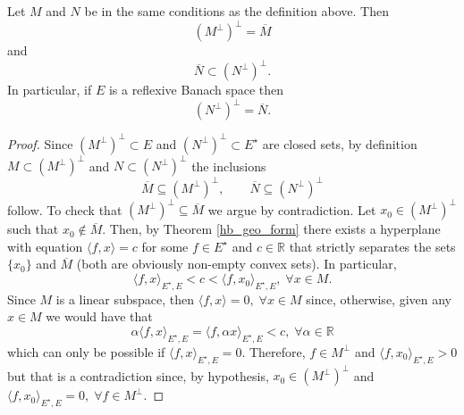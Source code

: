 \begin{lemma}\label{banach_ortho_lemma}
    Let \(M\) and \(N\) be in the same conditions as the definition above. Then
    \[
        (M^\perp)^\perp = \overline{M}
    \]
    and
    \[
        \overline{N} \subset (N^\perp)^\perp.
    \]
    In particular, if \(E\) is a reflexive Banach space then
    \[
        (N^\perp)^\perp = \overline{N}.
    \]
\end{lemma}
\begin{proof}
    Since \((M^\perp)^\perp \subset E\) and \((N^\perp)^\perp \subset E^\star\) are closed sets, by definition \(M \subset (M^\perp)^\perp\) and \(N \subset (N^\perp)^\perp\) the inclusions
    \[
        \overline{M} \subseteq (M^\perp)^\perp, \qquad \overline{N} \subseteq (N^\perp)^\perp
    \]
    follow. To check that \((M^\perp)^\perp \subseteq \overline{M}\) we argue by contradiction. Let \(x_0 \in (M^\perp)^\perp\) such that \(x_0 \not \in \overline{M}\). Then, by Theorem \ref{hb_geo_form} there exists a hyperplane with equation \(\langle f, x \rangle = c\) for some \(f \in E^\star\) and \(c \in \mathbb{R}\) that strictly separates the sets \(\{x_0\}\) and \(\overline{M}\) (both are obviously non-empty convex sets). In particular,
    \[
        \langle f, x \rangle_{E^\star, E} < c < \langle f, x_0 \rangle_{E^\star, E}, \; \forall x \in M.
    \]
    Since \(M\) is a linear subspace, then \(\langle f, x \rangle = 0, \; \forall x \in M\) since, otherwise, given any \(x \in M\) we would have that
    \[
        \alpha \langle f, x \rangle_{E^\star, E} = \langle f, \alpha x \rangle_{E^\star, E} < c, \; \forall \alpha \in \mathbb{R}
    \]
    which can only be possible if \(\langle f, x \rangle_{E^\star, E} = 0\). Therefore, \(f \in M^\perp\) and \(\langle f, x_0 \rangle_{E^\star, E} > 0\) but that is a contradiction since, by hypothesis, \(x_0 \in (M^\perp)^\perp\) and \(\langle f, x_0 \rangle_{E^\star, E} = 0, \; \forall f \in M^\perp\).


\end{proof}
